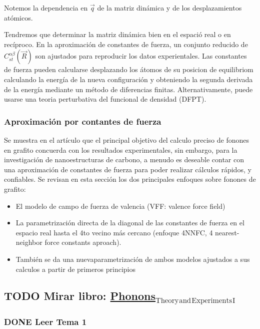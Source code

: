 \documentclass[11pt]{article}
\begin{document}
Notemos la dependencia en \(\vec q\) de la matriz dinámica y de los desplazamientos atómicos.

Tendremos que determinar la matriz dinámica bien en el espació real o en recíproco. En la aproximación de constantes de fuerza, un conjunto reducido de \(C^{\alpha\beta}_{st}(\vec R)\) son ajustados para reproducir los datos experientales. Las constantes de fuerza pueden calcularse desplazando los átomos de su posicion de equilibriom calculando la energía de la nueva configuración y obteniendo la segunda derivada de la energía mediante un método de diferencias finitas.
Alternativamente, puede usarse una teoria perturbativa del funcional de densidad (DFPT).

\subsubsection{Aproximación por contantes de fuerza}
\label{sec:org84a3e5d}

Se muestra en el artículo que el principal objetivo del calculo preciso de fonones en grafito concuerda con los resultados experimentales, sin embargo, para la investigación de nanoestructuras de carbono, a menudo es deseable contar con una aproximación de constantes de fuerza para poder realizar cálculos rápidos, y confiables.
Se revisan en esta sección los dos principales enfoques sobre fonones de grafito:
\begin{itemize}
\item El modelo de campo de fuerza de valencia (VFF: valence force field)
\item La parametrización directa de la diagonal de las constantes de fuerza en el espacio real hasta el 4to vecino más cercano (enfoque 4NNFC, 4 nearest-neighbor force constants aproach).
\item También se da una nuevaparametrización de ambos modelos ajustados a sus calculos a partir de primeros principios
\end{itemize}


\subsection{{\bfseries\sffamily TODO} Mirar libro: \href{Phonons\_Theory\_and\_Experiments\_I.pdf}{Phonons\(_{\text{Theory}}\)\(_{\text{and}}\)\(_{\text{Experiments}}\)\(_{\text{I}}\)}}
\label{sec:orgd5e4329}
\subsubsection{{\bfseries\sffamily DONE} Leer Tema 1}
\label{sec:org062781a}
\end{document}
